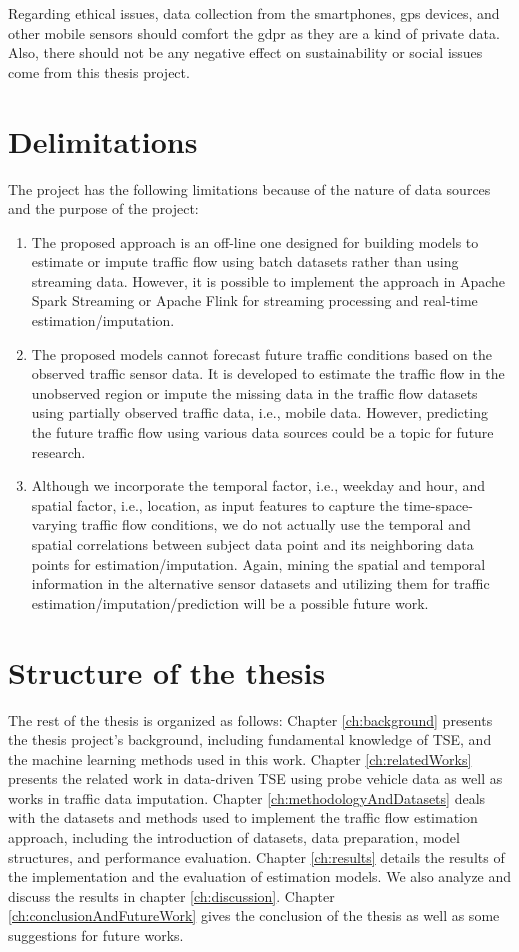 \documentclass[english]{kththesis}
\begin{document}
Regarding ethical issues, data collection from the smartphones, \gls{gps} devices, and other mobile sensors should comfort the \gls{gdpr} as they are a kind of private data. Also, there should not be any negative effect on sustainability or social issues come from this thesis project.

\section{Delimitations}
\label{sec:delimitations}
The project has the following limitations because of the nature of data sources and the purpose of the project:
\begin{enumerate}
    \item The proposed approach is an off-line one designed for building models to estimate or impute traffic flow using batch datasets rather than using streaming data. However, it is possible to implement the approach in Apache Spark Streaming or Apache Flink for streaming processing and real-time estimation/imputation.
    \item The proposed models cannot forecast future traffic conditions based on the observed traffic sensor data. It is developed to estimate the traffic flow in the unobserved region or impute the missing data in the traffic flow datasets using partially observed traffic data, i.e., mobile data. However, predicting the future traffic flow using various data sources could be a topic for future research.
    \item Although we incorporate the temporal factor, i.e., weekday and hour, and spatial factor, i.e., location, as input features to capture the time-space-varying traffic flow conditions, we do not actually use the temporal and spatial correlations between subject data point and its neighboring data points for estimation/imputation. Again, mining the spatial and temporal information in the alternative sensor datasets and utilizing them for traffic estimation/imputation/prediction will be a possible future work.
\end{enumerate}


\section{Structure of the thesis}
\label{sec:structureOfThesis}
The rest of the thesis is organized as follows: Chapter \ref{ch:background} presents the thesis project's background, including fundamental knowledge of TSE, and the machine learning methods used in this work. Chapter \ref{ch:relatedWorks} presents the related work in data-driven TSE using probe vehicle data as well as works in traffic data imputation. Chapter \ref{ch:methodologyAndDatasets} deals with the datasets and methods used to implement the traffic flow estimation approach, including the introduction of datasets, data preparation, model structures, and performance evaluation. Chapter \ref{ch:results} details the results of the implementation and the evaluation of estimation models. We also analyze and discuss the results in chapter \ref{ch:discussion}. Chapter \ref{ch:conclusionAndFutureWork} gives the conclusion of the thesis as well as some suggestions for future works.
\end{document}
